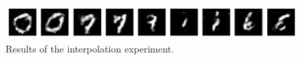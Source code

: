 \documentclass[12pt]{article}
\begin{document}
\begin{figure}[t]
    \centering
    \includegraphics[width=0.5\linewidth]{p7.png}
    \caption{Results of the interpolation experiment.}
    \label{fig:p7}
\end{figure}

 
\end{document}
